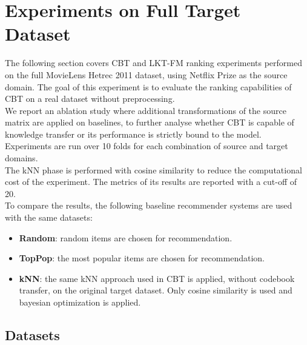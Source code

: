 \chapter{Experiments on Full Target Dataset}
\label{ch:experiments-full}

The following section covers CBT and LKT-FM ranking experiments performed on the full MovieLens Hetrec 2011 dataset, using Netflix Prize as the source domain. The goal of this experiment is to evaluate the ranking capabilities of CBT on a real dataset without preprocessing.\\
We report an ablation study where additional transformations of the source matrix are applied on baselines, to further analyse whether CBT is capable of knowledge transfer or its performance is strictly bound to the model.\\
Experiments are run over 10 folds for each combination of source and target domains.\\
The kNN phase is performed with cosine similarity to reduce the computational cost of the experiment. The metrics of its results are reported with a cut-off of 20.\\
To compare the results, the following baseline recommender systems are used with the same datasets:
\begin{itemize}
\item \textbf{Random}: random items are chosen for recommendation.
\item \textbf{TopPop}: the most popular items are chosen for recommendation.
\item \textbf{kNN}: the same kNN approach used in CBT is applied, without codebook transfer, on the original target dataset. Only cosine similarity is used and bayesian optimization is applied.
\end{itemize}



\section{Datasets}

